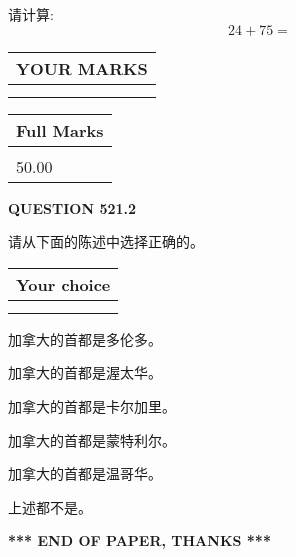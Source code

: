 \documentclass{ctexart}
\begin{document}
  
 
请计算:
\begin{equation}
24 +  %
75 = \nonumber
\end{equation}
 

 

 
  
\vspace{0.2in}
  
\noindent\begin{tabular}{|l|}
\hline
 YOUR MARKS  \\
\hline
 \\ 
 \\ 
\hline
\end{tabular}
\hspace{0.05in} \begin{tabular}{|l|}
\hline
 Full Marks  \\
\hline
 \\ 
50.00 \\
\hline
\end{tabular}
{\textbf{\Large{QUESTION
521.2 
}}}
  
  
请从下面的陈述中选择正确的。
  
  
\noindent\hspace{3.0in} \begin{tabular}{|l|}
\hline
Your choice \\
\hline
 \\ 
 \\ 
\hline
\end{tabular}
  
  
 
 
加拿大的首都是多伦多。
 
 
加拿大的首都是渥太华。
 
 
加拿大的首都是卡尔加里。
 
 
加拿大的首都是蒙特利尔。
 
 
加拿大的首都是温哥华。
 
 
 上述都不是。
 
 
   
   
 \vspace{0.2in}
 
   
   
   
   
\vspace{1.0in} 
{\textbf{\large{ *** END OF PAPER, THANKS *** }}} 
   
\end{document}
